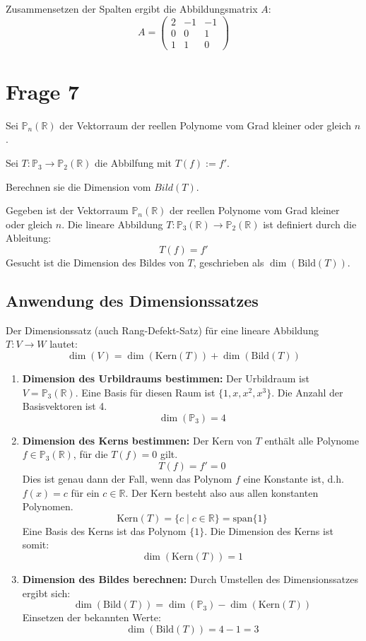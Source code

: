 Zusammensetzen der Spalten ergibt die Abbildungsmatrix \(A\):
\[
A = \begin{pmatrix} 2 & -1 & -1 \\ 0 & 0 & 1 \\ 1 & 1 & 0 \end{pmatrix}
\]

\section{Frage 7} 

Sei $\mathbb{P}_n(\mathbb{R})$ der Vektorraum der reellen Polynome vom Grad kleiner oder gleich $n$.

Sei $T : \mathbb{P}_3 \rightarrow \mathbb{P}_2(\mathbb{R})$ die Abbilfung mit $T(f) := f'$.

Berechnen sie die Dimension vom $Bild(T)$.

Gegeben ist der Vektorraum $\mathbb{P}_n(\mathbb{R})$ der reellen Polynome vom Grad kleiner oder gleich $n$.
Die lineare Abbildung $T: \mathbb{P}_3(\mathbb{R}) \to \mathbb{P}_2(\mathbb{R})$ ist definiert durch die Ableitung:
\[ T(f) = f' \]
Gesucht ist die Dimension des Bildes von $T$, geschrieben als $\dim(\text{Bild}(T))$.

\subsection*{Anwendung des Dimensionssatzes}
Der Dimensionssatz (auch Rang-Defekt-Satz) für eine lineare Abbildung $T: V \to W$ lautet:
\[ \dim(V) = \dim(\text{Kern}(T)) + \dim(\text{Bild}(T)) \]

\begin{enumerate}
    \item \textbf{Dimension des Urbildraums bestimmen:}
    Der Urbildraum ist $V = \mathbb{P}_3(\mathbb{R})$. Eine Basis für diesen Raum ist $\{1, x, x^2, x^3\}$. Die Anzahl der Basisvektoren ist 4.
    \[ \dim(\mathbb{P}_3) = 4 \]

    \item \textbf{Dimension des Kerns bestimmen:}
    Der Kern von $T$ enthält alle Polynome $f \in \mathbb{P}_3(\mathbb{R})$, für die $T(f) = 0$ gilt.
    \[ T(f) = f' = 0 \]
    Dies ist genau dann der Fall, wenn das Polynom $f$ eine Konstante ist, d.h. $f(x) = c$ für ein $c \in \mathbb{R}$. Der Kern besteht also aus allen konstanten Polynomen.
    \[ \text{Kern}(T) = \{c \mid c \in \mathbb{R}\} = \text{span}\{1\} \]
    Eine Basis des Kerns ist das Polynom $\{1\}$. Die Dimension des Kerns ist somit:
    \[ \dim(\text{Kern}(T)) = 1 \]

    \item \textbf{Dimension des Bildes berechnen:}
    Durch Umstellen des Dimensionssatzes ergibt sich:
    \[ \dim(\text{Bild}(T)) = \dim(\mathbb{P}_3) - \dim(\text{Kern}(T)) \]
    Einsetzen der bekannten Werte:
    \[ \dim(\text{Bild}(T)) = 4 - 1 = 3 \]
\end{enumerate}
